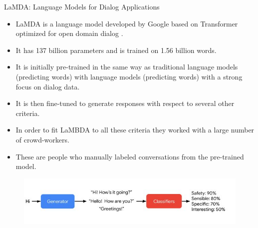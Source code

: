 \documentclass[handout]{beamer}
\begin{document}
\begin{frame}{LaMDA: Language Models for Dialog Applications}

\begin{scriptsize}
\begin{itemize}
\item LaMDA is a language model developed by Google based on Transformer optimized for open domain dialog \cite{thoppilan2022lamda}.
\item It has 137 billion parameters and is trained on 1.56 billion words.
\item It is initially pre-trained in the same way as traditional language models (predicting words) with language models (predicting words) with a strong focus on dialog data.
\item It is then ﬁne-tuned to generate responses with respect to several other criteria.
\item In order to fit LaMBDA to all these criteria they worked with a large number of crowd-workers.
\item These are people who manually labeled conversations from the pre-trained model.
\end{itemize}
\end{scriptsize}

 \begin{figure}[h]
        	\includegraphics[scale = 0.5]{pics/lambda.png}
        \end{figure}



\end{frame}
\end{document}
